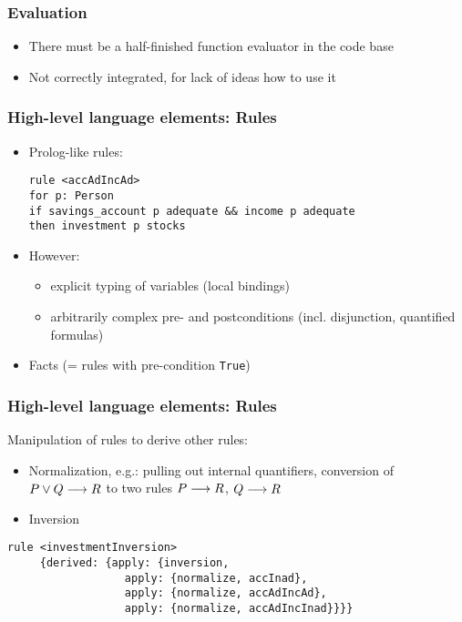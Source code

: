 \documentclass{beamer}
\begin{document}
\begin{frame}[fragile]\frametitle{Evaluation}

  \begin{itemize}
  \item There must be a half-finished function evaluator in the code base
  \item Not correctly integrated, for lack of ideas how to use it 
  \end{itemize}

\end{frame}

\begin{frame}[fragile]\frametitle{High-level language elements: Rules}

  \begin{itemize}
  \item Prolog-like rules:

    \begin{verbatim}
rule <accAdIncAd>
for p: Person
if savings_account p adequate && income p adequate
then investment p stocks
\end{verbatim}
    
  \item However:
    \begin{itemize}
    \item explicit typing of variables (local bindings)
    \item arbitrarily complex pre- and postconditions (incl. disjunction,
      quantified formulas)
    \end{itemize}
  \item Facts (= rules with pre-condition \texttt{True})
  \end{itemize}

\end{frame}

\begin{frame}[fragile]\frametitle{High-level language elements: Rules}

  Manipulation of rules to derive other rules:
  \begin{itemize}
  \item Normalization, e.g.: pulling out internal quantifiers, conversion of $P
    \vee Q \longrightarrow R$ to two rules $P \longrightarrow R$, $Q \longrightarrow R$
  \item Inversion
  \end{itemize}

\begin{verbatim}
rule <investmentInversion>
     {derived: {apply: {inversion,
     	          apply: {normalize, accInad},
     	          apply: {normalize, accAdIncAd},
     	          apply: {normalize, accAdIncInad}}}}
\end{verbatim}
  

\end{frame}
\end{document}
